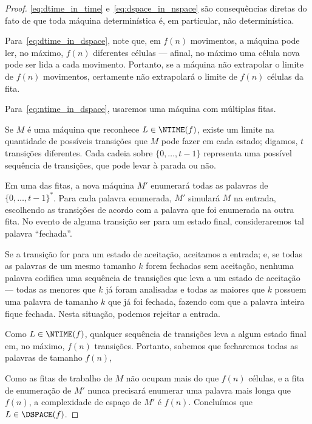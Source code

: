 \begin{proof}
    \ref{eq:dtime_in_time} e~\ref{eq:dspace_in_nspace} são consequências diretas
    do fato de que toda máquina determinística é,
    em particular, não determinística.

    Para~\ref{eq:dtime_in_dspace},
    note que, em $f(n)$ movimentos,
    a máquina pode ler, no máximo,
    $f(n)$ diferentes células
    --- afinal, no máximo uma célula nova pode ser lida a cada movimento.
    Portanto,
    se a máquina não extrapolar o limite de $f(n)$ movimentos,
    certamente não extrapolará o limite de $f(n)$ células da fita.

    Para~\ref{eq:ntime_in_dspace},
    usaremos uma máquina com múltiplas fitas.

    Se $M$ é uma máquina que reconhece $L \in \NTIME(f)$,
    existe um limite na quantidade de possíveis transições
    que $M$ pode fazer em cada estado;
    digamos, $t$ transições diferentes.
    Cada cadeia sobre $\{0, \dots, t-1\}$ representa uma possível
    sequência de transições,
    que pode levar à parada ou não.

    Em uma das fitas,
    a nova máquina $M'$
    enumerará todas as palavras de ${\{0, \dots, t-1\}}^*$.
    Para cada palavra enumerada,
    $M'$ simulará $M$ na entrada,
    escolhendo as transições de acordo com a palavra
    que foi enumerada na outra fita.
    No evento de alguma transição ser para um estado final,
    consideraremos tal palavra ``fechada''.

    Se a transição for para um estado de aceitação,
    aceitamos a entrada;
    e, se todas as palavras de um mesmo tamanho $k$
    forem fechadas sem aceitação,
    nenhuma palavra
    codifica uma sequência de transições
    que leva a um estado de aceitação
    --- todas as menores que $k$ já foram analisadas
    e todas as maiores que $k$
    possuem uma palavra de tamanho $k$ que já foi fechada,
    fazendo com que a palavra inteira fique fechada.
    Nesta situação, podemos rejeitar a entrada.

    Como $L \in \NTIME(f)$,
    qualquer sequência de transições leva a algum estado final
    em, no máximo, $f(n)$ transições.
    Portanto,
    sabemos que fecharemos todas as palavras
    de tamanho $f(n)$,

    Como as fitas de trabalho de $M$
    não ocupam mais do que $f(n)$ células,
    e a fita de enumeração de $M'$
    nunca precisará enumerar uma palavra mais longa que $f(n)$,
    a complexidade de espaço de $M'$ é $f(n)$.
    Concluímos que $L \in \DSPACE(f)$.
\end{proof}


